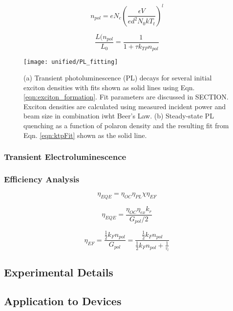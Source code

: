 \documentclass[../thesis.tex]{subfiles}
\begin{document}
\begin{equation}
n_{pol}=eN_c\left(\frac{\epsilon V}{ed^2N_0kT_t}\right)^l
\label{eqn:kptDensity}
\end{equation}

\begin{equation}
\frac{L(n_{pol}}{L_0}=\frac{1}{1+\tau k_{TP}n_{pol}}
\label{eqn:ktpFit}
\end{equation}




\begin{figure}[ht]
\texttt{[image: unified/PL\_fitting]}
\caption{(a) Transient photoluminescence (PL) decays for several initial exciton densities with fits shown as solid lines using Eqn. \ref{eqn:exciton_formation}.  Fit parameters are discussed in SECTION.  Exciton densities are calculated using measured incident power and beam size in combination iwht Beer's Law.  (b) Steady-state PL quenching as a function of polaron density and the resulting fit from Eqn. \ref{eqn:ktpFit} shown as the solid line.}
\label{fig:PL_fitting}
\end{figure}
\subsubsection{Transient Electroluminescence}
\subsubsection{Efficiency Analysis}

\begin{equation}
\eta_{EQE}=\eta_{OC}\eta_{PL}\chi\eta_{EF}
\label{eqn:eqeSimple}
\end{equation}

\begin{equation}
\eta_{EQE}=\frac{\eta_{OC}\eta_{ex}k_r}{G_{pol}/2}
\label{eqn:eqeReform}
\end{equation}

\begin{equation}
\eta_{EF}=\frac{\frac{1}{2}k_Fn_{pol}}{G_{pol}}=\frac{\frac{1}{2}k_Fn_{pol}}{\frac{1}{2}k_Fn_{pol}+\frac{1}{\tau_l}}
\label{eqn:excitonFormation}
\end{equation}

\subsection{Experimental Details}
\subsection{Application to Devices}
\end{document}
